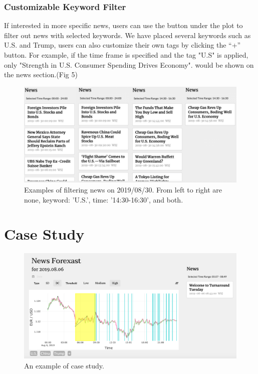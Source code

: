 \documentclass[sigconf]{acmart}
\begin{document}
\subsubsection{Customizable Keyword Filter
}
If interested in more specific news, users can use the button under the plot to filter out news with selected keywords. We have placed several keywords such as U.S. and Trump, users can also customize their own tags by clicking the “+” button. For example, if the time frame is specified and the tag "U.S" is applied, only "Strength in U.S. Consumer Spending Drives Economy". would be shown on the news section.(Fig 5)


\begin{figure}[h]
  \centering
  \includegraphics[width=\linewidth]{news.png}
  \caption{Examples of filtering news on 2019/08/30. From left to right are none, keyword: 'U.S.', time: '14:30-16:30', and both.}
  \Description{}
\end{figure}

\section{Case Study}\label{sec:case}

\begin{figure}[h]
  \centering
  \includegraphics[width=\linewidth]{case.png}
  \caption{An example of case study.}
  \Description{}
\end{figure}
\end{document}
